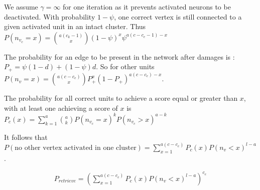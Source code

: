 \documentclass[english,10pt,twocolumn]{IEEEtran}
\renewcommand{\ge}{\geqslant}
\theoremstyle{definition}
\begin{document}
	We assume $\gamma = \infty$ for one iteration as it prevents activated neurons to be deactivated.
	With probability $1 - \psi$, one correct vertex is still connected to a given activated unit in an intact cluster. Thus $P(n_{v_c} = x ) = {a (c_k-1) \choose x} (1-\psi)^{x} \psi ^ { a (c - c_e -1) - x }$	
	
	
	The probability for an edge to be present in the network after damages is : $P_+ = \psi (1 - d) + (1 - \psi) d$. So for other units $P(n_v = x) = {a (c - c_e) \choose x} P_+^x (1-P_+)^{a (c - c_e) -x }$.
	
%	
	
	
	The probability for all correct units to achieve a score equal or greater than $x$, with at least one achieving a score of $x$ is $P_c (x) =\sum_{k = 1}^{a} { a \choose k }   P(n_{v_c} = x)^k P(n_{v_c} > x)^{a-k} $

	It follows that $P(\mbox{no other vertex activated in one cluster})= \sum_{x = 1}^{a (c - c_e)} P_c(x) P(n_v < x)^{l-a}$.%
	

	\begin{align}
	P_{retrieve}=  \left( \sum_{x = 1}^{a ( c- c_e)} P_c(x) P(n_v <x)^{l-a} \right )^{c_e}
	\label{psi_formula_th}
	\end{align}
\end{document}
